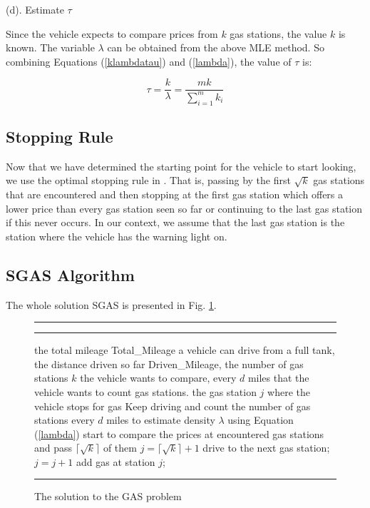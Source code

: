 \documentclass[conference]{IEEEtran}
\theoremstyle{definition}
\begin{document}
\noindent (d). Estimate   $\tau$

Since the vehicle expects to compare prices from $k$ gas stations, the value $k$ is known. The variable $\lambda$ can be obtained from the above MLE method. So combining Equations (\ref{klambdatau}) and (\ref{lambda}),  the value of $\tau$ is:

\begin{equation} \label{tau}
\tau = \frac{k}{\lambda} = \frac{mk}{\sum_{i=1}^{m}k_{i}}
\end{equation}

\subsection{Stopping Rule}
Now that we have determined the starting point for the vehicle to start looking, we use the optimal stopping rule in \cite{Gilbert1966}. That is, passing by the first $\sqrt{k}$ gas stations that are encountered and then stopping at the first gas station which offers a lower price than every gas station seen so far or continuing to the last gas station if this never occurs. In our context, we assume that the last gas station is the station where the vehicle has the warning light on.

\subsection{SGAS Algorithm}

The whole solution SGAS is presented in Fig. \ref{SGAS}.

\begin{figure}[!hbt]
\vspace{0.2cm}
\hrule \medskip {} \smallskip
\hrule
\smallskip
\begin{algorithmic}[1]
 the total mileage Total\_Mileage a vehicle can drive from a full tank, the distance driven so far Driven\_Mileage, the number of gas stations $k$ the vehicle wants to compare, every $d$ miles that the vehicle wants to count gas stations.
 the gas station $j$ where the vehicle stops for gas
\STATE Keep driving and count the number of gas stations every $d$ miles to estimate density $\lambda$ using Equation (\ref{lambda})
\ENDWHILE
{}
\STATE start to compare the prices at encountered gas stations and pass $\lceil\sqrt{k}\rceil$ of them
\ENDIF
\STATE $j = \lceil\sqrt{k}\rceil + 1$
\STATE drive to the next gas station; $j = j+1$
\ENDWHILE
\STATE add gas at station $j$;
\end{algorithmic}
\hrule
\caption{The solution to the GAS problem}
\label{SGAS}
\end{figure}
\end{document}
